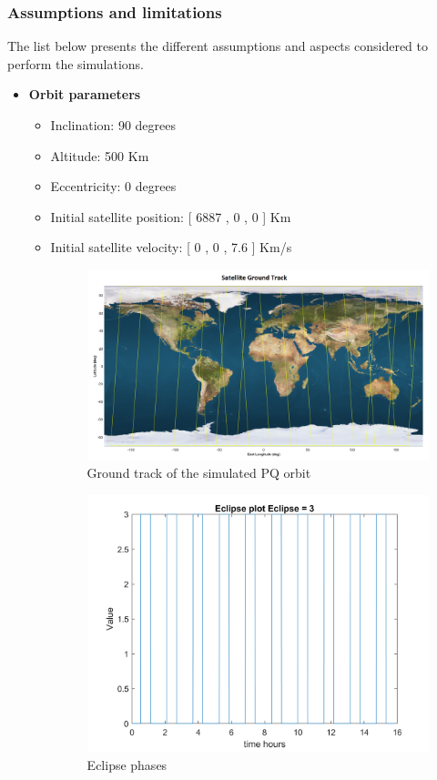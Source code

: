 \subsubsection{Assumptions and limitations}
The list below presents the different assumptions and aspects considered to perform the simulations.
\begin{itemize}
    \item \textbf{Orbit parameters}
    \begin{itemize}
        \item Inclination: 90 degrees
        \item Altitude: 500 Km
        \item Eccentricity: 0 degrees
        \item Initial satellite position: [ 6887 , 0 , 0 ] Km
        \item Initial satellite velocity: [ 0 , 0 , 7.6 ] Km/s
        \begin{figure}[H]
            \centering
            \includegraphics[width=0.8\linewidth]{res/img/3_simulation_performance/Sat_groundtrack.png}
            \caption{Ground track of the simulated PQ orbit}
            \label{fig:GTrack}
        \end{figure}

        \begin{figure}[H]
            \centering
            \includegraphics[width=0.7\linewidth]{res/img/Nadir_no_EKF/Eclipse phases.png}
            \caption{Eclipse phases}
            \label{fig:EclipsePhases}
        \end{figure}


\end{itemize}
\end{itemize}
